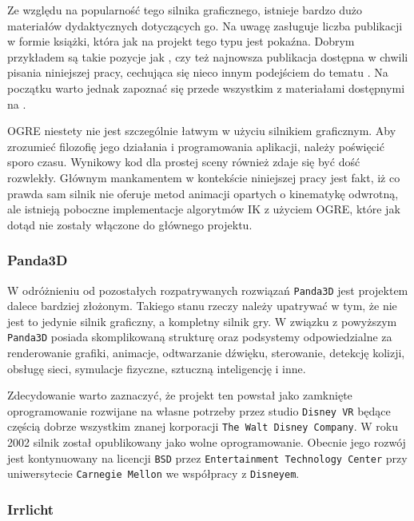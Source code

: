 \documentclass[11pt]{mwrep}
\begin{document}
      Ze względu na popularność tego silnika graficznego, istnieje bardzo dużo materiałów dydaktycznych dotyczących go. Na uwagę zasługuje liczba publikacji w formie książki, która jak na projekt tego typu jest pokaźna. Dobrym przykładem są takie pozycje jak \cite{ogreb1}, czy też najnowsza publikacja dostępna w chwili pisania niniejszej pracy, cechująca się nieco innym podejściem do tematu \cite{ogreb2}. Na początku warto jednak zapoznać się przede wszystkim z materiałami dostępnymi na \cite{ogre}.

      OGRE niestety nie jest szczególnie łatwym w użyciu silnikiem graficznym. Aby zrozumieć filozofię jego działania i programowania aplikacji, należy poświęcić sporo czasu. Wynikowy kod dla prostej sceny również zdaje się być dość rozwlekły. Głównym mankamentem w kontekście niniejszej pracy jest fakt, iż co prawda sam silnik nie oferuje metod animacji opartych o kinematykę odwrotną, ale istnieją poboczne implementacje algorytmów IK z użyciem OGRE, które jak dotąd nie zostały włączone do głównego projektu.

      \subsubsection{Panda3D}
      W odróżnieniu od pozostałych rozpatrywanych rozwiązań \texttt{Panda3D} jest projektem dalece bardziej złożonym. Takiego stanu rzeczy należy upatrywać w tym, że nie jest to jedynie silnik graficzny, a kompletny silnik gry. W związku z powyższym \texttt{Panda3D} posiada skomplikowaną strukturę oraz podsystemy odpowiedzialne za renderowanie grafiki, animacje, odtwarzanie dźwięku, sterowanie, detekcję kolizji, obsługę sieci, symulacje fizyczne, sztuczną inteligencję i inne.

      Zdecydowanie warto zaznaczyć, że projekt ten powstał jako zamknięte oprogramowanie rozwijane na własne potrzeby przez studio \texttt{Disney VR} będące częścią dobrze wszystkim znanej korporacji \texttt{The Walt Disney Company}. W roku 2002 silnik został opublikowany jako wolne oprogramowanie. Obecnie jego rozwój jest kontynuowany na licencji \texttt{BSD} przez \texttt{Entertainment Technology Center} przy uniwersytecie \texttt{Carnegie Mellon} we współpracy z \texttt{Disneyem}.



	

      \subsubsection{Irrlicht}
\end{document}
